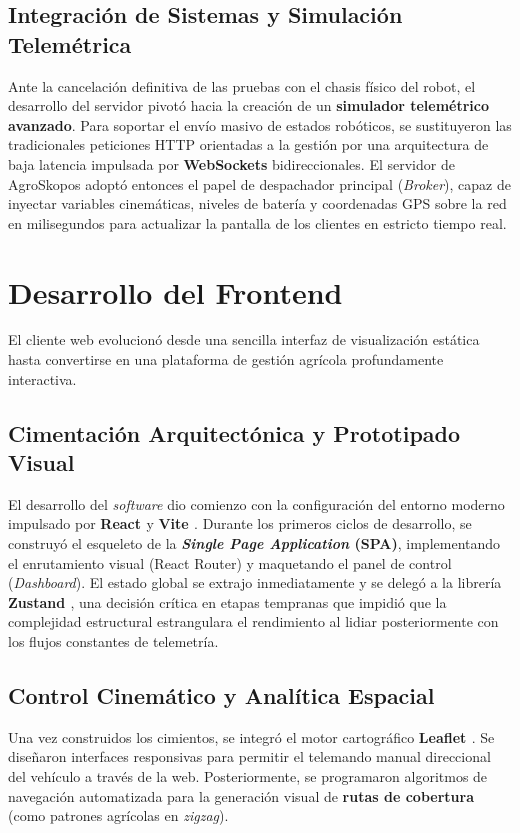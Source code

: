 \subsection{Integración de Sistemas y Simulación Telemétrica}
Ante la cancelación definitiva de las pruebas con el chasis físico del robot, el desarrollo del servidor pivotó hacia la creación de un \textbf{simulador telemétrico avanzado}. Para soportar el envío masivo de estados robóticos, se sustituyeron las tradicionales peticiones HTTP orientadas a la gestión por una arquitectura de baja latencia impulsada por \textbf{WebSockets} bidireccionales. El servidor de AgroSkopos adoptó entonces el papel de despachador principal (\textit{Broker}), capaz de inyectar variables cinemáticas, niveles de batería y coordenadas GPS sobre la red en milisegundos para actualizar la pantalla de los clientes en estricto tiempo real.

\section{Desarrollo del Frontend}

El cliente web evolucionó desde una sencilla interfaz de visualización estática hasta convertirse en una plataforma de gestión agrícola profundamente interactiva.

\subsection{Cimentación Arquitectónica y Prototipado Visual}
El desarrollo del \textit{software} dio comienzo con la configuración del entorno moderno impulsado por \textbf{React \cite{react}} y \textbf{Vite \cite{vite}}. Durante los primeros ciclos de desarrollo, se construyó el esqueleto de la \textbf{\textit{Single Page Application} (SPA)}, implementando el enrutamiento visual (React \cite{react} Router) y maquetando el panel de control (\textit{Dashboard}). El estado global se extrajo inmediatamente y se delegó a la librería \textbf{Zustand \cite{zustand}}, una decisión crítica en etapas tempranas que impidió que la complejidad estructural estrangulara el rendimiento al lidiar posteriormente con los flujos constantes de telemetría.


\subsection{Control Cinemático y Analítica Espacial}
Una vez construidos los cimientos, se integró el motor cartográfico \textbf{Leaflet \cite{leaflet}}. Se diseñaron interfaces responsivas para permitir el telemando manual direccional del vehículo a través de la web. Posteriormente, se programaron algoritmos de navegación automatizada para la generación visual de \textbf{rutas de cobertura} (como patrones agrícolas en \textit{zigzag}).

